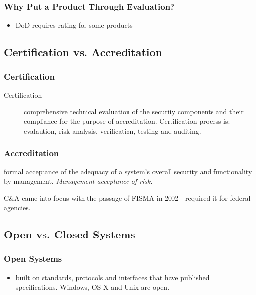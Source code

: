 \documentclass[11pt]{article}
\begin{document}
\subsubsection{Why Put a Product Through Evaluation?}
\label{sec:orgb6fdc90}
\begin{itemize}
\item DoD requires rating for some products
\end{itemize}
\subsection{Certification vs. Accreditation}
\label{sec:orgf1fb4ff}
\subsubsection{Certification}
\label{sec:org6258ad5}
\begin{description}
\item[{Certification}] comprehensive technical evaluation of the security components and their compliance for the purpose of accreditation. Certification process is: evalaution, risk analysis, verification, testing and auditing.
\end{description}
\subsubsection{Accreditation}
\label{sec:org67d71a4}
\begin{description}
\item[{Accreditation}] formal acceptance of the adequacy of a system's overall security and functionality by management. \emph{Management acceptance of risk.}
\item C\&A came into focus with the passage of FISMA in 2002 - required it for federal agencies.
\end{description}
\subsection{Open vs. Closed Systems}
\label{sec:org47b7e7c}
\subsubsection{Open Systems}
\label{sec:org3f1e63c}
\begin{itemize}
\item built on standards, protocols and interfaces that have published specifications. Windows, OS X and Unix are open.
\end{itemize}
\end{document}
